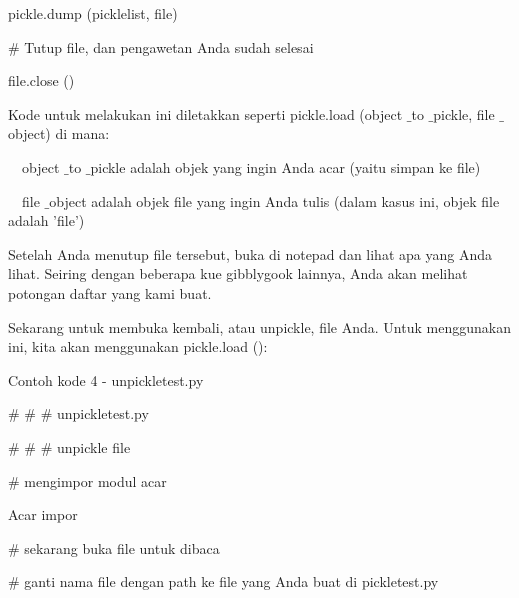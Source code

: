 \noindent 
pickle.dump (picklelist, file) \par
\noindent 
\vspace{12pt}
\noindent 
 $  \#  $ Tutup file, dan pengawetan Anda sudah selesai \par
\noindent 
file.close () \par
\vspace{14pt}
\noindent 
Kode untuk melakukan ini diletakkan seperti pickle.load (object $  \_  $to $  \_  $pickle, file $  \_  $object) di mana: \par
\noindent 
\vspace{12pt}
\noindent 
 $  $ $  $ $  $ $  $object $  \_  $to $  \_  $pickle adalah objek yang ingin Anda acar (yaitu simpan ke file) \par
\noindent 
 $  $ $  $ $  $ $  $file $  \_  $object adalah objek file yang ingin Anda tulis (dalam kasus ini, objek file adalah 'file') \par
\noindent 
\vspace{12pt}
\noindent 
Setelah Anda menutup file tersebut, buka di notepad dan lihat apa yang Anda lihat. Seiring dengan beberapa kue gibblygook lainnya, Anda akan melihat potongan daftar yang kami buat. \par
\noindent 
\vspace{12pt}
\noindent 
Sekarang untuk membuka kembali, atau unpickle, file Anda. Untuk menggunakan ini, kita akan menggunakan pickle.load (): \par
\noindent 
Contoh kode 4 - unpickletest.py \par
\noindent 
\vspace{10pt}
\noindent 
{\fontsize{10pt}{10pt}\selectfont  $  \#  $ $  \#  $ $  \#  $ unpickletest.py} \par
\noindent 
{\fontsize{10pt}{10pt}\selectfont  $  \#  $ $  \#  $ $  \#  $ unpickle file} \par
\noindent 
\vspace{10pt}
\noindent 
{\fontsize{10pt}{10pt}\selectfont  $  \#  $ mengimpor modul acar} \par
\noindent 
{\fontsize{10pt}{10pt}\selectfont Acar impor} \par
\noindent 
\vspace{10pt}
\noindent 
{\fontsize{10pt}{10pt}\selectfont  $  \#  $ sekarang buka file untuk dibaca} \par
\noindent 
{\fontsize{10pt}{10pt}\selectfont  $  \#  $ ganti nama file dengan path ke file yang Anda buat di pickletest.py} \par
\noindent 
